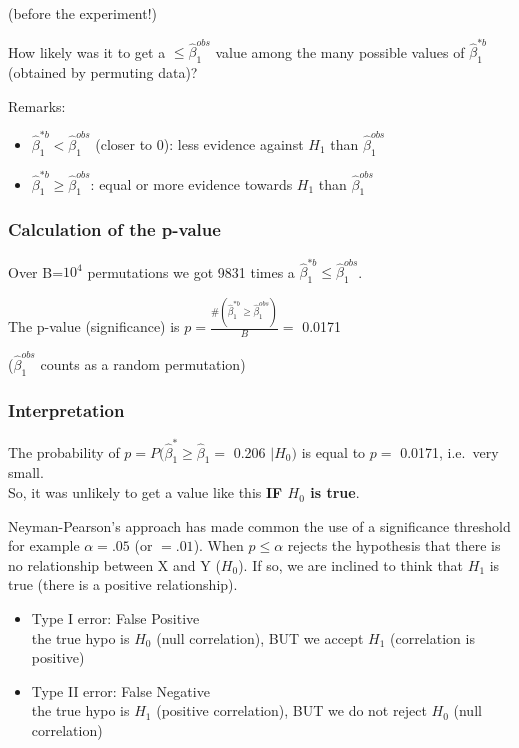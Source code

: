 \documentclass[
]{article}
\providecommand{\tightlist}{%
  \setlength{\itemsep}{0pt}\setlength{\parskip}{0pt}}
\begin{document}
(before the experiment!)

How likely was it to get a \(\leq \hat{\beta}_1 ^{obs}\) value among the
many possible values of \(\hat{\beta}_1 ^{*b}\) (obtained by permuting
data)?

Remarks:

\begin{itemize}
\tightlist
\item
  \(\hat{\beta}_1 ^{* b}< \hat{\beta}_1 ^{obs}\) (closer to 0): less
  evidence against \(H_1\) than \(\hat{\beta}_1 ^{obs}\)
\item
  \(\hat{\beta}_1 ^{* b} \geq \hat{\beta}_1 ^{obs}\): equal or more
  evidence towards \(H_1\) than \(\hat{\beta}_1 ^{obs}\)
\end{itemize}

\hypertarget{calculation-of-the-p-value}{%
\subsubsection{Calculation of the
p-value}\label{calculation-of-the-p-value}}

Over B=\ensuremath{10^{4}} permutations we got 9831 times a
\(\hat{\beta}_1 ^{* b} \leq \hat{\beta}_1 ^{obs}\).

The p-value (significance) is
\(p=\frac{\# (\hat{\beta}_1 ^{* b} \geq \hat{\beta}_1 ^{obs})}{B} =\)
0.0171

(\(\hat{\beta}_1 ^{obs}\) counts as a random permutation)

\hypertarget{interpretation}{%
\subsubsection{Interpretation}\label{interpretation}}

The probability of \(p=P (\hat{\beta}_1 ^ * \geq \hat{\beta}_1=\) 0.206
\(| H_0)\) is equal to \(p =\) 0.0171, i.e.~very small.\\
So, it was unlikely to get a value like this \textbf{IF \(H_0\) is
true}.

Neyman-Pearson's approach has made common the use of a significance
threshold for example \(\alpha=.05\) (or \(=. 01\)). When
\(p \leq \alpha\) rejects the hypothesis that there is no relationship
between X and Y (\(H_0\)). If so, we are inclined to think that \(H_1\)
is true (there is a positive relationship).

\begin{itemize}
\tightlist
\item
  Type I error: False Positive\\
  the true hypo is \(H_0\) (null correlation), BUT we accept \(H_1\)
  (correlation is positive)
\item
  Type II error: False Negative\\
  the true hypo is \(H_1\) (positive correlation), BUT we do not reject
  \(H_0\) (null correlation)
\end{itemize}
\end{document}
